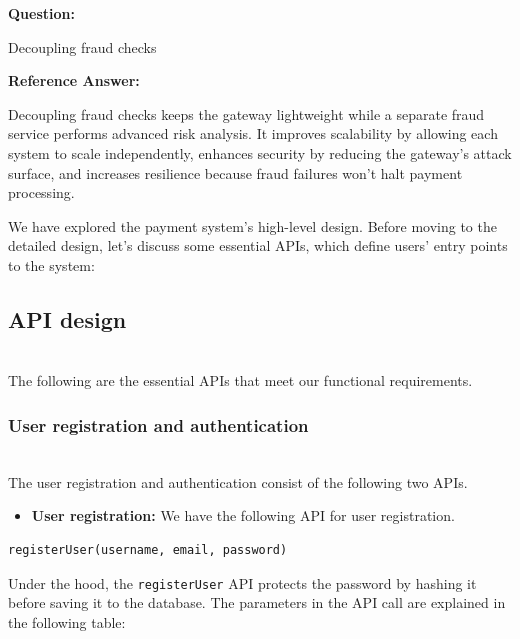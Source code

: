 \textbf{Question:}

Decoupling fraud checks

\textbf{Reference Answer:}

Decoupling fraud checks keeps the gateway lightweight while a separate fraud service performs advanced risk analysis. It improves scalability by allowing each system to scale independently, enhances security by reducing the gateway's attack surface, and increases resilience because fraud failures won't halt payment processing.

We have explored the payment system's high-level design. Before moving to the detailed design, let's discuss some essential APIs, which define users' entry points to the system:

\subsection{API design}\label{_jNkIX5lj4BO1BnLMgeMD}
\\
The following are the essential APIs that meet our functional requirements.

\subsubsection{User registration and authentication}\label{iZ6VydMlG0oHFhzpIzzhu}
\\
The user registration and authentication consist of the following two APIs.

\begin{itemize}
\item
\protect{}\label{LZzn0e6JRUg7zSYcfhcvR}
\textbf{User registration:} We have the following API for user registration.
\end{itemize}

\begin{lstlisting}[language=plaintext]
registerUser(username, email, password)
\end{lstlisting}

Under the hood, the \texttt{registerUser} API protects the password by hashing it before saving it to the database. The parameters in the API call are explained in the following table:

\begin{table}[htbp]
\centering
\small
{}
\end{table}

